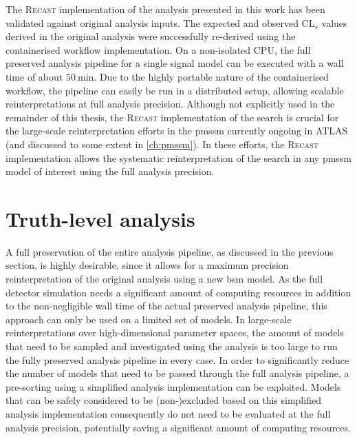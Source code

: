 The \textsc{Recast} implementation of the analysis presented in this work has been validated against original analysis inputs. The expected and observed CL$_s$ values derived in the original analysis were successfully re-derived using the containerised workflow implementation. On a non-isolated CPU, the full preserved analysis pipeline for a single signal model can be executed with a wall time of about $\SI{50}{\minute}$. Due to the highly portable nature of the containerised workflow, the pipeline can easily be run in a distributed setup, allowing scalable reinterpretations at full analysis precision. Although not explicitly used in the remainder of this thesis, the \textsc{Recast} implementation of the \onelepton search is crucial for the large-scale reinterpretation efforts in the \gls{pmssm} currently ongoing in ATLAS (and discussed to some extent in \cref{ch:pmssm}). In these efforts, the \textsc{Recast} implementation allows the systematic reinterpretation of the \onelepton search in any \gls{pmssm} model of interest using the full analysis precision.





\section{Truth-level analysis}\label{sec:truth_analysis}

\graphicspath{{chapter-pmssm/Figs/Vector/}{chapter-pmssm/Figs/}}


A full preservation of the entire analysis pipeline, as discussed in the previous section, is highly desirable, since it allows for a maximum precision reinterpretation of the original analysis using a new \gls{bsm} model.
As the full detector simulation needs a significant amount of computing resources in addition to the non-negligible wall time of the actual preserved analysis pipeline, this approach can only be used on a limited set of models.
In large-scale reinterpretations over high-dimensional parameter spaces, the amount of models that need to be sampled and investigated using the analysis is too large to run the fully preserved analysis pipeline in every case.
In order to significantly reduce the number of models that need to be passed through the full analysis pipeline, a pre-sorting using a simplified analysis implementation can be exploited. Models that can be safely considered to be (non-)excluded based on this simplified analysis implementation consequently do not need to be evaluated at the full analysis precision, potentially saving a significant amount of computing resources.

